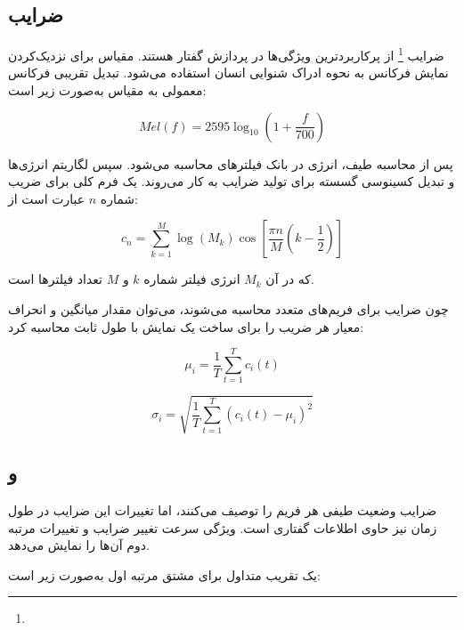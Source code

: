 \subsection{ضرایب }

ضرایب
\footnote{}
از پرکاربردترین ویژگی‌ها در پردازش گفتار هستند. مقیاس
برای نزدیک‌کردن نمایش فرکانس به نحوه ادراک شنوایی انسان استفاده می‌شود. تبدیل تقریبی فرکانس معمولی به مقیاس
به‌صورت زیر است:

\begin{equation}
Mel(f)
=
2595
\log_{10}
\left(
1+\frac{f}{700}
\right)
\end{equation}

پس از محاسبه طیف، انرژی در بانک فیلترهای
محاسبه می‌شود. سپس لگاریتم انرژی‌ها و تبدیل کسینوسی گسسته برای تولید ضرایب به کار می‌روند. یک فرم کلی برای ضریب شماره $n$ عبارت است از:

\begin{equation}
c_n
=
\sum_{k=1}^{M}
\log(M_k)
\cos
\left[
\frac{\pi n}{M}
\left(
k-\frac{1}{2}
\right)
\right]
\end{equation}

که در آن $M_k$ انرژی فیلتر شماره $k$ و $M$ تعداد فیلترها است.

چون ضرایب
برای فریم‌های متعدد محاسبه می‌شوند، می‌توان مقدار میانگین و انحراف معیار هر ضریب را برای ساخت یک نمایش با طول ثابت محاسبه کرد:

\begin{equation}
\mu_i
=
\frac{1}{T}
\sum_{t=1}^{T}
c_i(t)
\end{equation}

\begin{equation}
\sigma_i
=
\sqrt{
\frac{1}{T}
\sum_{t=1}^{T}
(c_i(t)-\mu_i)^2
}
\end{equation}


\subsection{ و }

ضرایب
وضعیت طیفی هر فریم را توصیف می‌کنند، اما تغییرات این ضرایب در طول زمان نیز حاوی اطلاعات گفتاری است. ویژگی
سرعت تغییر ضرایب و
تغییرات مرتبه دوم آن‌ها را نمایش می‌دهد.

یک تقریب متداول برای مشتق مرتبه اول به‌صورت زیر است:

